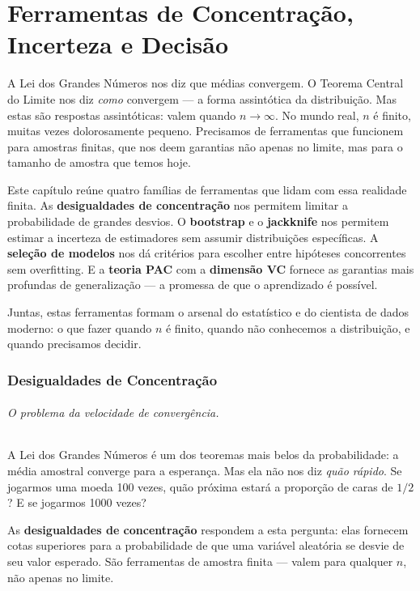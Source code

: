 \documentclass{tufte-handout}
\begin{document}
\part{Ferramentas de Concentração, Incerteza e Decisão}

A Lei dos Grandes Números nos diz que médias convergem. O Teorema Central do Limite nos diz \textit{como} convergem --- a forma assintótica da distribuição. Mas estas são respostas assintóticas: valem quando $n \to \infty$. No mundo real, $n$ é finito, muitas vezes dolorosamente pequeno. Precisamos de ferramentas que funcionem para amostras finitas, que nos deem garantias não apenas no limite, mas para o tamanho de amostra que temos hoje.

Este capítulo reúne quatro famílias de ferramentas que lidam com essa realidade finita. As \textbf{desigualdades de concentração} nos permitem limitar a probabilidade de grandes desvios. O \textbf{bootstrap} e o \textbf{jackknife} nos permitem estimar a incerteza de estimadores sem assumir distribuições específicas. A \textbf{seleção de modelos} nos dá critérios para escolher entre hipóteses concorrentes sem overfitting. E a \textbf{teoria PAC} com a \textbf{dimensão VC} fornece as garantias mais profundas de generalização --- a promessa de que o aprendizado é possível.

Juntas, estas ferramentas formam o arsenal do estatístico e do cientista de dados moderno: o que fazer quando $n$ é finito, quando não conhecemos a distribuição, e quando precisamos decidir.

\section{Desigualdades de Concentração}

\paragraph{O problema da velocidade de convergência.}

A Lei dos Grandes Números é um dos teoremas mais belos da probabilidade: a média amostral converge para a esperança. Mas ela não nos diz \textit{quão rápido}. Se jogarmos uma moeda 100 vezes, quão próxima estará a proporção de caras de $1/2$? E se jogarmos 1000 vezes?

As \textbf{desigualdades de concentração} respondem a esta pergunta: elas fornecem cotas superiores para a probabilidade de que uma variável aleatória se desvie de seu valor esperado. São ferramentas de amostra finita --- valem para qualquer $n$, não apenas no limite.
\end{document}
